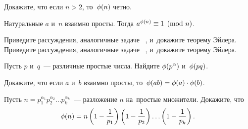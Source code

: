 Докажите, что если $n > 2$, то~$\phi(n)$ четно.

Натуральные $a$ и~$n$ взаимно просты.
Тогда $a^{\phi(n)} \equiv 1 \pmod{n}$.

\begin{problems}

\item
\subproblem
Приведите рассуждения, аналогичные задаче~%
,
и~докажите теорему Эйлера.
\\
\subproblem
Приведите рассуждения, аналогичные задаче~%
,
и~докажите теорему Эйлера.

\item
\subproblem
Пусть $p$ и~$q$~--- различные простые числа.
Найдите $\phi(p^\alpha)$ и~$\phi(p q)$.

\subproblem
Докажите, что если $a$ и~$b$ взаимно просты,
то~\(
    \phi(a b) = \phi(a) \cdot \phi(b)
\).

\subproblem
Пусть \(
    n
=
    p_{1}^{\alpha_{1}} p_{2}^{\alpha_{2}} \ldots p_{k}^{\alpha_{k}}
\)~---
разложение $n$ на~простые множители.
Докажите, что
\[
    \phi(n)
=
    n
    \left( 1 - \frac{1}{p_{1}} \right)
    \left( 1 - \frac{1}{p_{2}} \right)
    \ldots
    \left( 1 - \frac{1}{p_{k}} \right)
. \, \]


\end{problems}

\endgroup %

